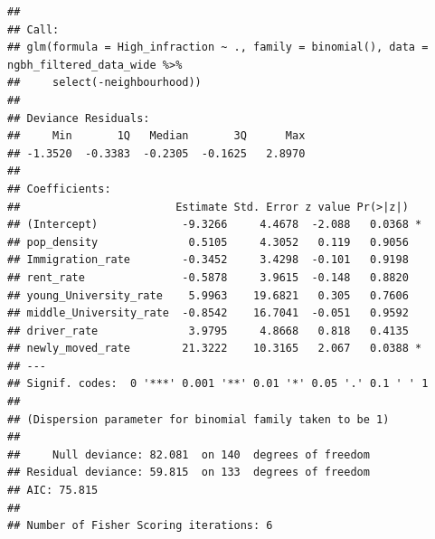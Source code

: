 \documentclass[
]{article}
\begin{document}
\begin{verbatim}
## 
## Call:
## glm(formula = High_infraction ~ ., family = binomial(), data = ngbh_filtered_data_wide %>% 
##     select(-neighbourhood))
## 
## Deviance Residuals: 
##     Min       1Q   Median       3Q      Max  
## -1.3520  -0.3383  -0.2305  -0.1625   2.8970  
## 
## Coefficients:
##                        Estimate Std. Error z value Pr(>|z|)  
## (Intercept)             -9.3266     4.4678  -2.088   0.0368 *
## pop_density              0.5105     4.3052   0.119   0.9056  
## Immigration_rate        -0.3452     3.4298  -0.101   0.9198  
## rent_rate               -0.5878     3.9615  -0.148   0.8820  
## young_University_rate    5.9963    19.6821   0.305   0.7606  
## middle_University_rate  -0.8542    16.7041  -0.051   0.9592  
## driver_rate              3.9795     4.8668   0.818   0.4135  
## newly_moved_rate        21.3222    10.3165   2.067   0.0388 *
## ---
## Signif. codes:  0 '***' 0.001 '**' 0.01 '*' 0.05 '.' 0.1 ' ' 1
## 
## (Dispersion parameter for binomial family taken to be 1)
## 
##     Null deviance: 82.081  on 140  degrees of freedom
## Residual deviance: 59.815  on 133  degrees of freedom
## AIC: 75.815
## 
## Number of Fisher Scoring iterations: 6
\end{verbatim}
\end{document}

